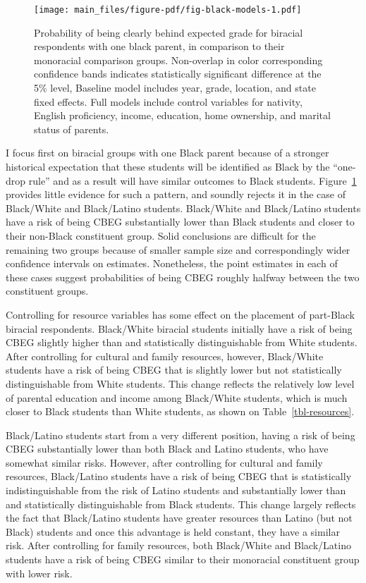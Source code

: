\documentclass[
  12pt,
  letterpaper,
]{article}
\begin{document}
\begin{figure}[p]

{\centering \texttt{[image: main\_files/figure-pdf/fig-black-models-1.pdf]}

}

\caption{\label{fig-black-models}Probability of being clearly behind
expected grade for biracial respondents with one black parent, in
comparison to their monoracial comparison groups. Non-overlap in color
corresponding confidence bands indicates statistically significant
difference at the 5\% level, Baseline model includes year, grade,
location, and state fixed effects. Full models include control variables
for nativity, English proficiency, income, education, home ownership,
and marital status of parents.}

\end{figure}

I focus first on biracial groups with one Black parent because of a
stronger historical expectation that these students will be identified
as Black by the ``one-drop rule'' and as a result will have similar
outcomes to Black students. Figure~\ref{fig-black-models} provides
little evidence for such a pattern, and soundly rejects it in the case
of Black/White and Black/Latino students. Black/White and Black/Latino
students have a risk of being CBEG substantially lower than Black
students and closer to their non-Black constituent group. Solid
conclusions are difficult for the remaining two groups because of
smaller sample size and correspondingly wider confidence intervals on
estimates. Nonetheless, the point estimates in each of these cases
suggest probabilities of being CBEG roughly halfway between the two
constituent groups.

Controlling for resource variables has some effect on the placement of
part-Black biracial respondents. Black/White biracial students initially
have a risk of being CBEG slightly higher than and statistically
distinguishable from White students. After controlling for cultural and
family resources, however, Black/White students have a risk of being
CBEG that is slightly lower but not statistically distinguishable from
White students. This change reflects the relatively low level of
parental education and income among Black/White students, which is much
closer to Black students than White students, as shown on
Table~\ref{tbl-resources}.

Black/Latino students start from a very different position, having a
risk of being CBEG substantially lower than both Black and Latino
students, who have somewhat similar risks. However, after controlling
for cultural and family resources, Black/Latino students have a risk of
being CBEG that is statistically indistinguishable from the risk of
Latino students and substantially lower than and statistically
distinguishable from Black students. This change largely reflects the
fact that Black/Latino students have greater resources than Latino (but
not Black) students and once this advantage is held constant, they have
a similar risk. After controlling for family resources, both Black/White
and Black/Latino students have a risk of being CBEG similar to their
monoracial constituent group with lower risk.
\end{document}

